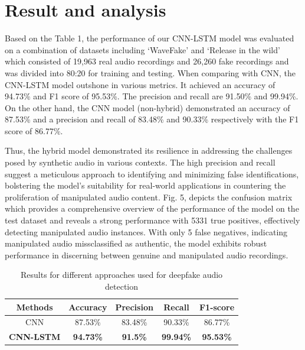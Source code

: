 \documentclass[conference]{IEEEtran}
\begin{document}
\section{Result and analysis}



Based on the Table 1, the performance of our CNN-LSTM model was evaluated on a combination of datasets including ‘WaveFake’ \cite{b17} and ‘Release in the wild’ \cite{b18} which consisted of 19,963 real audio recordings and 26,260 fake recordings and was divided into 80:20 for training and testing. 
When comparing with CNN, the CNN-LSTM model outshone in various metrics.
It achieved an accuracy of 94.73\% and F1 score of 95.53\%. The precision and recall are 91.50\% and 99.94\%. 
On the other hand, the CNN model (non-hybrid) demonstrated an accuracy of 87.53\% and a precision and recall of 83.48\% and 90.33\% respectively with the F1 score of 86.77\%.

Thus, the hybrid model demonstrated its resilience in addressing the challenges posed by synthetic audio in various contexts. The high precision and recall suggest a meticulous approach to identifying and minimizing false identifications, bolstering the model's suitability for real-world applications in countering the proliferation of manipulated audio content. Fig. 5, depicts the confusion matrix which provides a comprehensive overview of the performance of the model on the test dataset and reveals a strong performance with 5331 true positives, effectively detecting manipulated audio instances. With only 5 false negatives, indicating manipulated audio missclassified as authentic, the model exhibits robust performance in discerning between genuine and manipulated audio recordings.

\begin{table}
    \centering
    \captionsetup{justification=centering}
    \caption{Results for different approaches used for deepfake audio detection}
    \begin{tabular}{c|cccc}
        \hline
        \hline
        Methods & Accuracy & Precision & Recall & F1-score   \\
        \hline
        CNN & 87.53\% & 83.48\% & 90.33\% & 86.77\% \\
        \hline
        \textbf{CNN-LSTM} & \textbf{94.73\%} & \textbf{91.5\%} & \textbf{99.94\%} & \textbf{95.53\%} \\
        \hline
        \hline
    \end{tabular}
    
    \label{tab:my_label}
\end{table}
\end{document}
